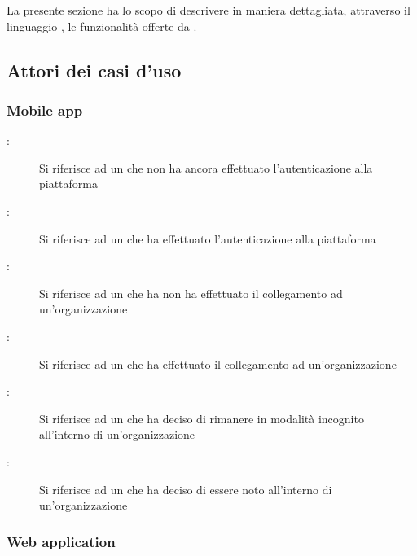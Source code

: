 \documentclass[../analisi-dei-requisiti.tex]{subfiles}
\begin{document}
La presente sezione ha lo scopo di descrivere in maniera dettagliata, attraverso il linguaggio , le funzionalità offerte da .

\subsection{Attori dei casi d'uso}%
\label{sub:attori_casi_duso}

\subsubsection{Mobile app}%
\label{subs:mobile_app}

\begin{description}
  \item[:] Si riferisce ad un  che non ha ancora effettuato l'autenticazione alla piattaforma
  \item[:] Si riferisce ad un  che ha effettuato l'autenticazione alla piattaforma
  \item[:] Si riferisce ad un  che ha non ha effettuato il collegamento ad un'organizzazione
  \item[:] Si riferisce ad un  che ha effettuato il collegamento ad un'organizzazione
  \item[:] Si riferisce ad un  che ha deciso di rimanere in modalità incognito all'interno di un'organizzazione
  \item[:] Si riferisce ad un  che ha deciso di essere noto all'interno di un'organizzazione
\end{description}


\subsubsection{Web application}%
\label{subs:web_application}
\end{document}
